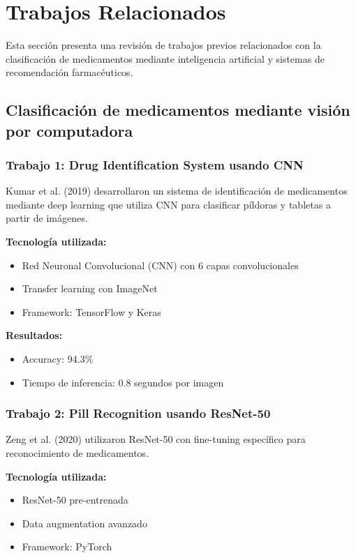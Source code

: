 \section{Trabajos Relacionados}

Esta sección presenta una revisión de trabajos previos relacionados con la clasificación de medicamentos mediante inteligencia artificial y sistemas de recomendación farmacéuticos.

\subsection{Clasificación de medicamentos mediante visión por computadora}

\subsubsection{Trabajo 1: Drug Identification System usando CNN}

Kumar et al. (2019) desarrollaron un sistema de identificación de medicamentos mediante deep learning que utiliza CNN para clasificar píldoras y tabletas a partir de imágenes.

\textbf{Tecnología utilizada:}
\begin{itemize}
	\item Red Neuronal Convolucional (CNN) con 6 capas convolucionales
	\item Transfer learning con ImageNet
	\item Framework: TensorFlow y Keras
\end{itemize}

\textbf{Resultados:}
\begin{itemize}
	\item Accuracy: 94.3\%
	\item Tiempo de inferencia: 0.8 segundos por imagen
\end{itemize}

\subsubsection{Trabajo 2: Pill Recognition usando ResNet-50}

Zeng et al. (2020) utilizaron ResNet-50 con fine-tuning específico para reconocimiento de medicamentos.

\textbf{Tecnología utilizada:}
\begin{itemize}
	\item ResNet-50 pre-entrenada
	\item Data augmentation avanzado
	\item Framework: PyTorch
\end{itemize}

